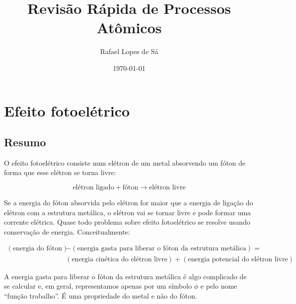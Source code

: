 \documentclass{article}
\title{Revis\~ao R\'apida de Processos At\^omicos}
\author{Rafael Lopes de S\'a}
\date{\today}
\begin{document}
\maketitle

\section{Efeito fotoel\'etrico}

\subsection{Resumo}

O efeito fotoel\'etrico consiste num el\'etron de um metal absorvendo um f\'oton de forma que esse el\'etron se torna livre:

\begin{equation}
\text{el\'etron ligado} + \text{f\'oton} \rightarrow \text{el\'etron livre}
\end{equation}



Se a energia do f\'oton absorvida pelo el\'etron for maior que a energia de liga\c c\~ao do el\'etron com a estrutura met\'alica, o el\'etron vai se tornar livre e pode formar uma corrente el\'etrica. Quase todo problema sobre efeito fotoel\'etrico se resolve usando conserva\c c\~ao de energia. Conceitualmente:

\begin{equation}
\begin{split}
(\text{energia do f\'oton}) &- (\text{energia gasta para liberar o f\'oton da estrutura met\'alica}) = \\
&(\text{energia cin\'etica do el\'etron livre}) + (\text{energia potencial do el\'etron livre})
\end{split}
\end{equation}

A energia gasta para liberar o f\'oton da estrutura met\'alica \'e algo complicado de se calcular e, em geral, representamos apenas por um s\'imbolo $\phi$ e pelo nome ``fun\c c\~ao trabalho''. \'E uma propriedade do metal e n\~ao do f\'oton.
\end{document}
